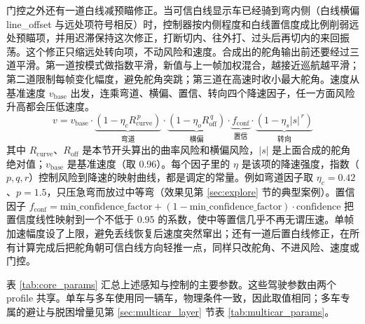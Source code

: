 \documentclass[UTF8,a4paper]{ctexart}
\begin{document}
门控之外还有一道白线减预瞄修正。当可信白线显示车已经骑到弯内侧（白线横偏 line\_offset 与远处项符号相反）时，控制器按内侧程度和白线置信度成比例削弱远处预瞄项，并用迟滞保持这次修正，打断切内、往外打、过头后再切内的来回振荡。这个修正只缩远处转向项，不动风险和速度。合成出的舵角输出前还要经过三道平滑。第一道按模式做指数平滑，新值与上一帧加权混合，越接近巡航越平滑；第二道限制每帧变化幅度，避免舵角突跳；第三道在高速时收小最大舵角。速度从基准速度 $v_{\text{base}}$ 出发，连乘弯道、横偏、置信、转向四个降速因子，任一方面风险升高都会压低速度。
\begin{equation*}
v = v_{\text{base}}\cdot
\underbrace{(1-\eta_c R_{\text{curve}}^{\,p})}_{\text{弯道}}\cdot
\underbrace{(1-\eta_o R_{\text{off}}^{\,q})}_{\text{横偏}}\cdot
\underbrace{f_{\text{conf}}}_{\text{置信}}\cdot
\underbrace{(1-\eta_s |s|^{\,r})}_{\text{转向}}
\end{equation*}
其中 $R_{\text{curve}}$、$R_{\text{off}}$ 是本节开头算出的曲率风险和横偏风险，$|s|$ 是上面合成的舵角绝对值；$v_{\text{base}}$ 是基准速度（取 0.96）。每个因子里的 $\eta$ 是该项的降速强度，指数（$p,q,r$）控制风险到降速的映射曲线，都是调定的常量。例如弯道因子取 $\eta_c{=}0.42$、$p{=}1.5$，只压急弯而放过中等弯（效果见第 \ref{sec:explore} 节的典型案例）。置信因子 $f_{\text{conf}}{=}\text{min\_confidence\_factor}{+}(1{-}\text{min\_confidence\_factor})\cdot\text{confidence}$ 把置信度线性映射到一个不低于 0.95 的系数，使中等置信几乎不再无谓压速。单帧加速幅度设了上限，避免丢线恢复后速度突然窜出；还有一道后置白线修正，在所有计算完成后把舵角朝可信白线方向轻推一点，同样只改舵角、不进风险、速度或门控。

表 \ref{tab:core_params} 汇总上述感知与控制的主要参数。这些驾驶参数由两个 profile 共享。单车与多车使用同一辆车，物理条件一致，因此取值相同；多车专属的避让与脱困增量见第 \ref{sec:multicar_layer} 节表 \ref{tab:multicar_params}。
\end{document}
